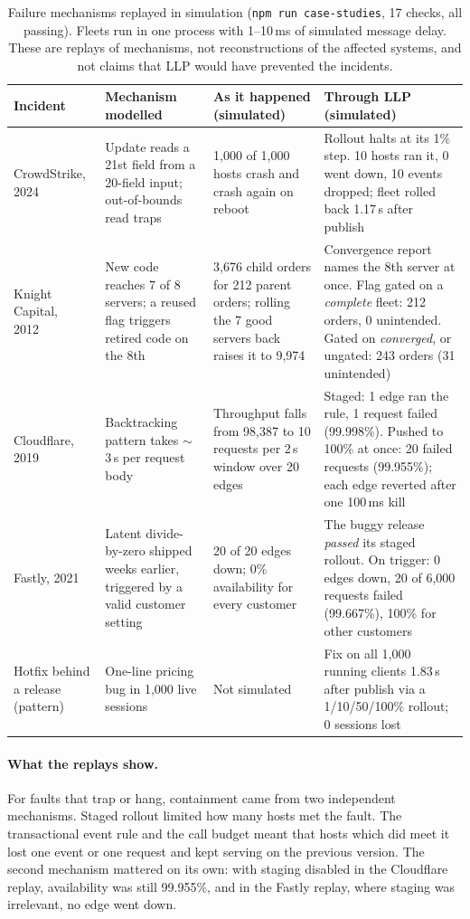 \documentclass[10pt,twocolumn]{article}
\newcommand{\code}[1]{\texttt{#1}}
\newcommand{\ms}{\,ms\xspace}
\newcommand{\s}{\,s\xspace}
\begin{document}
\begin{table}[t]
\centering\footnotesize
\begin{tabularx}{\textwidth}{@{}p{2.55cm}p{3.5cm}XX@{}}
\toprule
Incident & Mechanism modelled & As it happened (simulated) & Through LLP (simulated) \\
\midrule
CrowdStrike, 2024~\cite{crowdstrike2024rca} &
Update reads a 21st field from a 20-field input; out-of-bounds read traps &
1{,}000 of 1{,}000 hosts crash and crash again on reboot &
Rollout halts at its 1\% step. 10 hosts ran it, 0 went down, 10 events dropped; fleet rolled back
1.17\s after publish \\
Knight Capital, 2012~\cite{sec2013knight} &
New code reaches 7 of 8 servers; a reused flag triggers retired code on the 8th &
3{,}676 child orders for 212 parent orders; rolling the 7 good servers back raises it to 9{,}974 &
Convergence report names the 8th server at once. Flag gated on a \emph{complete} fleet: 212
orders, 0 unintended. Gated on \emph{converged}, or ungated: 243 orders (31 unintended) \\
Cloudflare, 2019~\cite{cloudflare2019} &
Backtracking pattern takes $\sim$3\s per request body &
Throughput falls from 98{,}387 to 10 requests per 2\s window over 20 edges &
Staged: 1 edge ran the rule, 1 request failed (99.998\%). Pushed to 100\% at once: 20 failed
requests (99.955\%); each edge reverted after one 100\ms kill \\
Fastly, 2021~\cite{fastly2021} &
Latent divide-by-zero shipped weeks earlier, triggered by a valid customer setting &
20 of 20 edges down; 0\% availability for every customer &
The buggy release \emph{passed} its staged rollout. On trigger: 0 edges down, 20 of 6{,}000
requests failed (99.667\%), 100\% for other customers \\
Hotfix behind a release (pattern) &
One-line pricing bug in 1{,}000 live sessions &
Not simulated &
Fix on all 1{,}000 running clients 1.83\s after publish via a 1/10/50/100\% rollout; 0 sessions lost \\
\bottomrule
\end{tabularx}
\caption{Failure mechanisms replayed in simulation (\code{npm run case-studies}, 17 checks, all
passing). Fleets run in one process with 1--10\ms of simulated message delay. These are replays of
mechanisms, not reconstructions of the affected systems, and not claims that LLP would have
prevented the incidents.}
\label{tab:cases}
\end{table}

\paragraph{What the replays show.} For faults that trap or hang, containment came from two
independent mechanisms. Staged rollout limited how many hosts met the fault. The transactional
event rule and the call budget meant that hosts which did meet it lost one event or one request
and kept serving on the previous version. The second mechanism mattered on its own: with staging
disabled in the Cloudflare replay, availability was still 99.955\%, and in the Fastly replay,
where staging was irrelevant, no edge went down.
\end{document}
